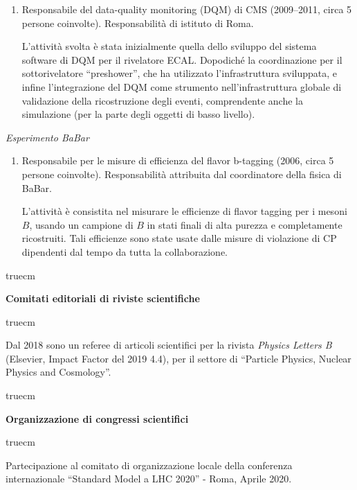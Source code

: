 \documentclass[11pt,twoside,a4paper]{article}
\begin{document}
\begin{enumerate}
    L'attivit\`a svolta \`e stata quella dell'installazione dei crate
    e schede dell'HV per gli APD di ECAL, della calibrazione e
    commissioning del sistema con i primi dati con i cosmici di CMS.
    Durante la prima presa dati \`e stato scopert l'insorgere di un
    rumore di pick-up portato dai cavi ai supermoduli del
    calorimetro. Dopo aver individuato personalmente l'origine del
    rumore ho curato la campagna di modifica del grounding delle
    schede che ha permesso la rimozione di questo rumore.

  \item Responsabile del data-quality monitoring (DQM) di CMS
    (2009--2011, circa 5 persone coinvolte). Responsabilit\`a di
    istituto di Roma.

    L'attivit\`a svolta \`e stata inizialmente quella dello sviluppo
    del sistema software di DQM per il rivelatore ECAL. Dopodich\'e la
    coordinazione per il sottorivelatore ``preshower'', che ha
    utilizzato l'infrastruttura sviluppata, e infine l'integrazione
    del DQM come strumento nell'infrastruttura globale di validazione
    della ricostruzione degli eventi, comprendente anche la
    simulazione (per la parte degli oggetti di basso livello).
    
\end{enumerate}

\textit{Esperimento BaBar}
\begin{enumerate}
\item Responsabile per le misure di efficienza del flavor b-tagging
  (2006, circa 5 persone coinvolte). Responsabilit\`a attribuita dal
  coordinatore della fisica di BaBar.

  L'attivit\`a \`e consistita nel misurare le efficienze di flavor
  tagging per i mesoni $B$, usando un campione di $B$ in stati finali
  di alta purezza e completamente ricostruiti. Tali efficienze sono
  state usate dalle misure di violazione di CP dipendenti dal tempo da
  tutta la collaborazione.
\end{enumerate}

 truecm
\begin{center}
\textbf{Comitati editoriali di riviste scientifiche}
\end{center}
 truecm

Dal 2018 sono un referee di articoli scientifici per la rivista
\textit{Physics Letters B} (Elsevier, Impact Factor del 2019 4.4), per
il settore di ``Particle Physics, Nuclear Physics and Cosmology''.


 truecm
\begin{center}
\textbf{Organizzazione di congressi scientifici}
\end{center}
 truecm

Partecipazione al comitato di organizzazione locale della conferenza
internazionale ``Standard Model a LHC 2020'' - Roma, Aprile 2020. 
\end{document}
